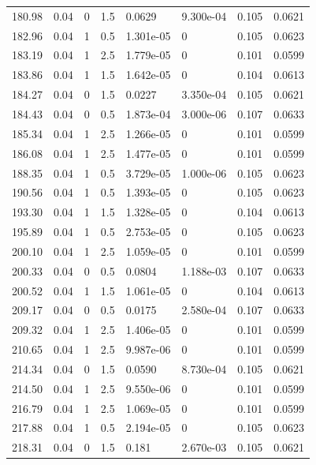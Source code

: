 \documentclass[preview]{standalone}
\begin{document}
{{{\begin{tabular}{L{1.2cm}C{1.2cm} C{0.3cm}C{0.5cm} C{1.4cm}C{1.4cm} C{1.4cm}C{1.4cm}}
  180.98  &  0.04  & 0     & 1.5 &  0.0629  & 9.300e-04  & 0.105 &  0.0621   \\ 
  182.96  &  0.04  & 1     & 0.5 &  1.301e-05  & 0  & 0.105 &  0.0623   \\ 
  183.19  &  0.04  & 1     & 2.5 &  1.779e-05  & 0  & 0.101 &  0.0599   \\ 
  183.86  &  0.04  & 1     & 1.5 &  1.642e-05  & 0  & 0.104 &  0.0613   \\ 
  184.27  &  0.04  & 0     & 1.5 &  0.0227  & 3.350e-04  & 0.105 &  0.0621   \\ 
  184.43  &  0.04  & 0     & 0.5 &  1.873e-04  & 3.000e-06  & 0.107 &  0.0633   \\ 
  185.34  &  0.04  & 1     & 2.5 &  1.266e-05  & 0  & 0.101 &  0.0599   \\ 
  186.08  &  0.04  & 1     & 2.5 &  1.477e-05  & 0  & 0.101 &  0.0599   \\ 
  188.35  &  0.04  & 1     & 0.5 &  3.729e-05  & 1.000e-06  & 0.105 &  0.0623   \\ 
  190.56  &  0.04  & 1     & 0.5 &  1.393e-05  & 0  & 0.105 &  0.0623   \\ 
  193.30  &  0.04  & 1     & 1.5 &  1.328e-05  & 0  & 0.104 &  0.0613   \\ 
  195.89  &  0.04  & 1     & 0.5 &  2.753e-05  & 0  & 0.105 &  0.0623   \\ 
  200.10  &  0.04  & 1     & 2.5 &  1.059e-05  & 0  & 0.101 &  0.0599   \\ 
  200.33  &  0.04  & 0     & 0.5 &  0.0804  & 1.188e-03  & 0.107 &  0.0633   \\ 
  200.52  &  0.04  & 1     & 1.5 &  1.061e-05  & 0  & 0.104 &  0.0613   \\ 
  209.17  &  0.04  & 0     & 0.5 &  0.0175  & 2.580e-04  & 0.107 &  0.0633   \\ 
  209.32  &  0.04  & 1     & 2.5 &  1.406e-05  & 0  & 0.101 &  0.0599   \\ 
  210.65  &  0.04  & 1     & 2.5 &  9.987e-06  & 0  & 0.101 &  0.0599   \\ 
  214.34  &  0.04  & 0     & 1.5 &  0.0590  & 8.730e-04  & 0.105 &  0.0621   \\ 
  214.50  &  0.04  & 1     & 2.5 &  9.550e-06  & 0  & 0.101 &  0.0599   \\ 
  216.79  &  0.04  & 1     & 2.5 &  1.069e-05  & 0  & 0.101 &  0.0599   \\ 
  217.88  &  0.04  & 1     & 0.5 &  2.194e-05  & 0  & 0.105 &  0.0623   \\ 
  218.31  &  0.04  & 0     & 1.5 &  0.181  & 2.670e-03  & 0.105 &  0.0621   \\ 

\end{tabular}}}}
\end{document}
